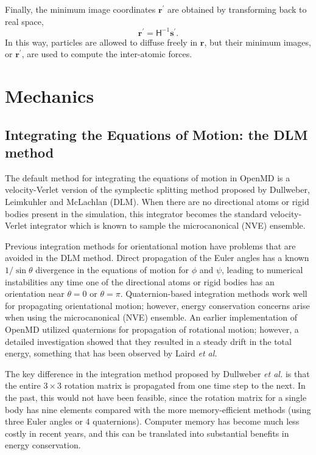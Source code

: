 \documentclass[letterpaper]{report}
\begin{document}
Finally, the minimum image coordinates $\mathbf{r}^{\prime}$ are
obtained by transforming back to real space,
\begin{equation}
\mathbf{r}^{\prime}=\mathsf{H}^{-1}\mathbf{s}^{\prime}.%
\end{equation}
In this way, particles are allowed to diffuse freely in $\mathbf{r}$,
but their minimum images, or $\mathbf{r}^{\prime}$, are used to compute
the inter-atomic forces.

\chapter{\label{section:mechanics}Mechanics}

\section{\label{section:integrate}Integrating the Equations of Motion: the
DLM method}

The default method for integrating the equations of motion in 
OpenMD is a velocity-Verlet version of the symplectic splitting method
proposed by Dullweber, Leimkuhler and McLachlan
(DLM).\cite{Dullweber1997} When there are no directional atoms or
rigid bodies present in the simulation, this integrator becomes the
standard velocity-Verlet integrator which is known to sample the
microcanonical (NVE) ensemble.\cite{Frenkel1996}

Previous integration methods for orientational motion have problems
that are avoided in the DLM method.  Direct propagation of the Euler
angles has a known $1/\sin\theta$ divergence in the equations of
motion for $\phi$ and $\psi$,\cite{Allen87} leading to numerical
instabilities any time one of the directional atoms or rigid bodies
has an orientation near $\theta=0$ or $\theta=\pi$.  Quaternion-based
integration methods work well for propagating orientational motion;
however, energy conservation concerns arise when using the
microcanonical (NVE) ensemble.  An earlier implementation of
OpenMD utilized quaternions for propagation of rotational motion;
however, a detailed investigation showed that they resulted in a
steady drift in the total energy, something that has been observed by
Laird {\it et al.}\cite{Laird97}

The key difference in the integration method proposed by Dullweber
\emph{et al.} is that the entire $3 \times 3$ rotation matrix is
propagated from one time step to the next. In the past, this would not
have been feasible, since the rotation matrix for a single body has
nine elements compared with the more memory-efficient methods (using
three Euler angles or 4 quaternions).  Computer memory has become much
less costly in recent years, and this can be translated into
substantial benefits in energy conservation.
\end{document}
